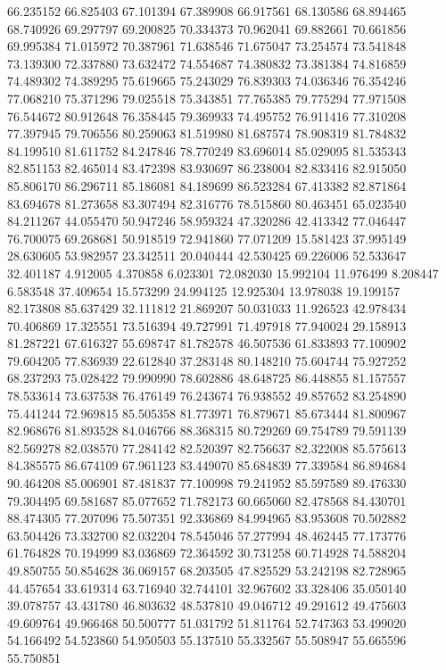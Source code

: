 66.235152
66.825403
67.101394
67.389908
66.917561
68.130586
68.894465
68.740926
69.297797
69.200825
70.334373
70.962041
69.882661
70.661856
69.995384
71.015972
70.387961
71.638546
71.675047
73.254574
73.541848
73.139300
72.337880
73.632472
74.554687
74.380832
73.381384
74.816859
74.489302
74.389295
75.619665
75.243029
76.839303
74.036346
76.354246
77.068210
75.371296
79.025518
75.343851
77.765385
79.775294
77.971508
76.544672
80.912648
76.358445
79.369933
74.495752
76.911416
77.310208
77.397945
79.706556
80.259063
81.519980
81.687574
78.908319
81.784832
84.199510
81.611752
84.247846
78.770249
83.696014
85.029095
81.535343
82.851153
82.465014
83.472398
83.930697
86.238004
82.833416
82.915050
85.806170
86.296711
85.186081
84.189699
86.523284
67.413382
82.871864
83.694678
81.273658
83.307494
82.316776
78.515860
80.463451
65.023540
84.211267
44.055470
50.947246
58.959324
47.320286
42.413342
77.046447
76.700075
69.268681
50.918519
72.941860
77.071209
15.581423
37.995149
28.630605
53.982957
23.342511
20.040444
42.530425
69.226006
52.533647
32.401187
4.912005
4.370858
6.023301
72.082030
15.992104
11.976499
8.208447
6.583548
37.409654
15.573299
24.994125
12.925304
13.978038
19.199157
82.173808
85.637429
32.111812
21.869207
50.031033
11.926523
42.978434
70.406869
17.325551
73.516394
49.727991
71.497918
77.940024
29.158913
81.287221
67.616327
55.698747
81.782578
46.507536
61.833893
77.100902
79.604205
77.836939
22.612840
37.283148
80.148210
75.604744
75.927252
68.237293
75.028422
79.990990
78.602886
48.648725
86.448855
81.157557
78.533614
73.637538
76.476149
76.243674
76.938552
49.857652
83.254890
75.441244
72.969815
85.505358
81.773971
76.879671
85.673444
81.800967
82.968676
81.893528
84.046766
88.368315
80.729269
69.754789
79.591139
82.569278
82.038570
77.284142
82.520397
82.756637
82.322008
85.575613
84.385575
86.674109
67.961123
83.449070
85.684839
77.339584
86.894684
90.464208
85.006901
87.481837
77.100998
79.241952
85.597589
89.476330
79.304495
69.581687
85.077652
71.782173
60.665060
82.478568
84.430701
88.474305
77.207096
75.507351
92.336869
84.994965
83.953608
70.502882
63.504426
73.332700
82.032204
78.545046
57.277994
48.462445
77.173776
61.764828
70.194999
83.036869
72.364592
30.731258
60.714928
74.588204
49.850755
50.854628
36.069157
68.203505
47.825529
53.242198
82.728965
44.457654
33.619314
63.716940
32.744101
32.967602
33.328406
35.050140
39.078757
43.431780
46.803632
48.537810
49.046712
49.291612
49.475603
49.609764
49.966468
50.500777
51.031792
51.811764
52.747363
53.499020
54.166492
54.523860
54.950503
55.137510
55.332567
55.508947
55.665596
55.750851
